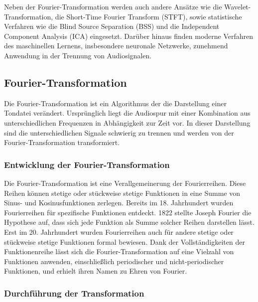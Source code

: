 \par

Neben der Fourier-Transformation werden auch andere Ansätze wie die Wavelet-Transformation, die Short-Time Fourier Transform (STFT), sowie statistische Verfahren wie die Blind Source Separation (BSS) und die Independent Component Analysis (ICA) eingesetzt. Darüber hinaus finden moderne Verfahren des maschinellen Lernens, insbesondere neuronale Netzwerke, zunehmend Anwendung in der Trennung von Audiosignalen.

%
\subsection{Fourier-Transformation}
%

Die Fourier-Transformation ist ein Algorithmus der die Darstellung einer Tondatei verändert. Ursprünglich liegt die Audiospur mit einer Kombination aus unterschiedlichen Frequenzen in Abhängigkeit zur Zeit vor. In dieser Darstellung sind die unterschiedlichen Signale schwierig zu trennen und werden von der Fourier-Transformation transformiert.

\par

%
\subsubsection{Entwicklung der Fourier-Transformation}
%

Die Fourier-Transformation ist eine Verallgemeinerung der Fourierreihen. Diese Reihen können stetige oder stückweise stetige Funktionen in eine Summe von Sinus- und Kosinusfunktionen zerlegen. Bereits im 18. Jahrhundert wurden Fourierreihen für spezifische Funktionen entdeckt. 1822 stellte Joseph Fourier die Hypothese auf, dass sich jede Funktion als Summe solcher Reihen darstellen lässt. Erst im 20. Jahrhundert wurden Fourierreihen auch für andere stetige oder stückweise stetige Funktionen formal bewiesen. Dank der Vollständigkeiten der Funktionenreihe lässt sich die Fourier-Transformation auf eine Vielzahl von Funktionen anwenden, einschließlich periodischer und nicht-periodischer Funktionen, und erhielt ihren Namen zu Ehren von Fourier.

\par

\subsubsection{Durchführung der Transformation}

